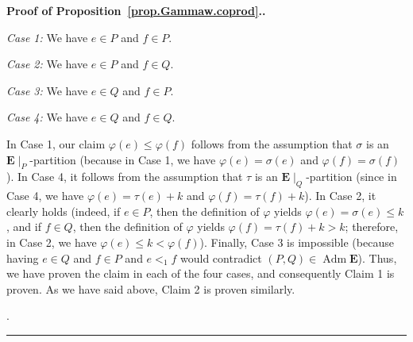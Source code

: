 \documentclass[numbers=enddot,12pt,final,onecolumn,notitlepage,abstracton]{scrartcl}
\theoremstyle{definition}
\newenvironment{proof}[1][Proof]{\noindent\textbf{#1.} }{\ \rule{0.5em}{0.5em}}
\newenvironment{vershort}{}{}
\newcommand{\Adm}{\operatorname{Adm}}
\newcommand{\EE}{{\mathbf{E}}}
\begin{document}
\begin{vershort}
\begin{proof}[Proof of Proposition~\ref{prop.Gammaw.coprod}.]
{\textit{Case 1:} We have $e \in P$ and $f \in P$.

\textit{Case 2:} We have $e \in P$ and $f \in Q$.

\textit{Case 3:} We have $e \in Q$ and $f \in P$.

\textit{Case 4:} We have $e \in Q$ and $f \in Q$.

In Case 1, our claim
$\varphi\left(e\right) \leq \varphi\left(f\right)$ follows
from the assumption that $\sigma$ is an
$\EE\mid_P$-partition (because in Case 1,
we have $\varphi\left(e\right) = \sigma\left(e\right)$
and $\varphi\left(f\right) = \sigma\left(f\right)$).
In Case 4, it follows from the
assumption that $\tau$ is an $\EE\mid_Q$-partition
(since in Case 4, we have
$\varphi\left(e\right) = \tau\left(e\right) + k$ and
$\varphi\left(f\right) = \tau\left(f\right) + k$). In
Case 2, it clearly holds (indeed,
if $e \in P$, then the definition of $\varphi$ yields
$\varphi\left(e\right) = \sigma\left(e\right) \leq k$,
and if $f \in Q$, then
the definition of $\varphi$ yields
$\varphi\left(f\right) = \tau\left(f\right) + k > k$;
therefore, in Case 2, we have
$\varphi\left(e\right) \leq k < \varphi\left(f\right)$).
Finally, Case 3 is impossible (because having $e \in Q$
and $f \in P$ and $e <_1 f$ would contradict
$\left(P, Q\right) \in \Adm \EE$). Thus, we have proven the
claim in each of the four cases, and consequently Claim 1 is
proven. As we have said above, Claim 2 is proven similarly.}.
\end{proof}
\end{vershort}
\end{document}
